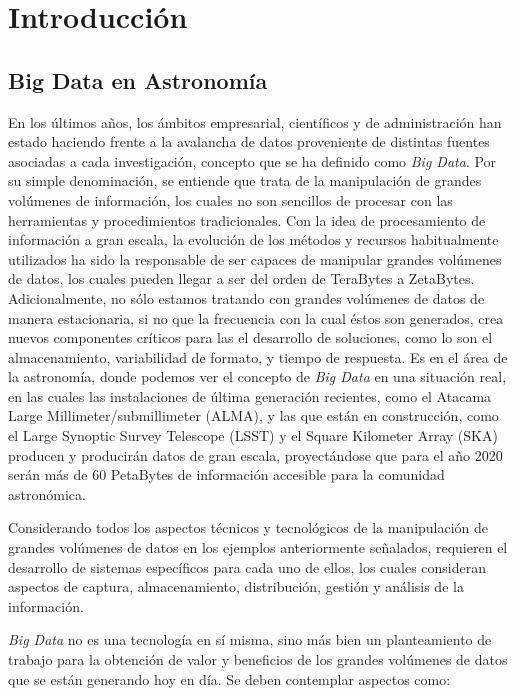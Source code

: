 \section{Introducción}

\subsection{Big Data en Astronomía}

En los últimos años, los ámbitos empresarial, científicos y de administración
han estado haciendo frente a la avalancha de datos proveniente de distintas
fuentes asociadas a cada investigación, concepto que se ha definido como
\emph{Big Data}.
Por su simple denominación, se entiende que trata de la manipulación de grandes
volúmenes de información, los cuales no son sencillos de procesar con las herramientas
y procedimientos tradicionales.
Con la idea de procesamiento de información a gran escala,
la evolución de los métodos y recursos habitualmente utilizados
ha sido la responsable de ser capaces de manipular grandes volúmenes de datos,
los cuales pueden llegar a ser del orden de TeraBytes a ZetaBytes.
Adicionalmente, no sólo estamos tratando con grandes volúmenes de datos
de manera estacionaria, si no que la frecuencia con la cual éstos son generados,
crea nuevos componentes críticos para las el desarrollo de soluciones,
como lo son el almacenamiento, variabilidad de formato, y tiempo de respuesta.
Es en el área de la astronomía, donde podemos ver el concepto de \emph{Big Data}
en una situación real, en las cuales las instalaciones de última generación
recientes, como el Atacama Large Millimeter/submillimeter (ALMA),
y las que están en construcción, como el Large Synoptic Survey Telescope (LSST) y el
Square Kilometer Array (SKA)
producen y producirán datos de gran escala, proyectándose que para el año 2020
serán más de 60 PetaBytes de información accesible para la comunidad astronómica.

Considerando todos los aspectos técnicos y tecnológicos de la manipulación
de grandes volúmenes de datos en los ejemplos anteriormente señalados, requieren
el desarrollo de sistemas específicos para cada uno de ellos,
los cuales consideran aspectos de captura, almacenamiento, distribución, gestión
y análisis de la información.

\emph{Big Data} no es una tecnología en sí misma, sino más bien un planteamiento de
trabajo para la obtención de valor y beneficios de los grandes volúmenes de
datos que se están generando hoy en día. Se deben contemplar aspectos como:


